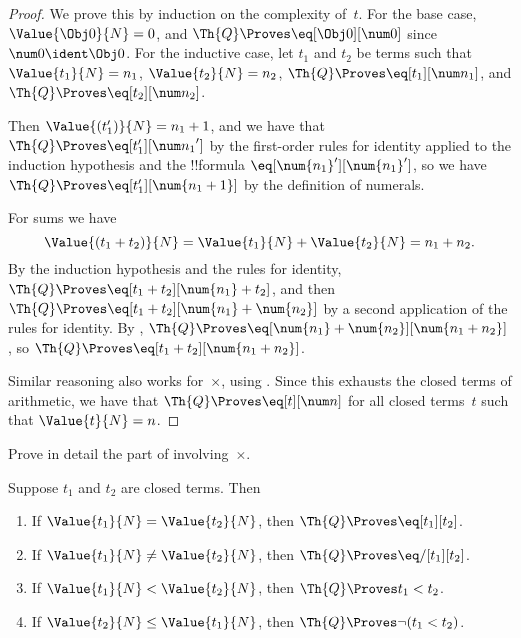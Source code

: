 \documentclass[../../../include/open-logic-section]{subfiles}
\begin{document}
\begin{proof}
We prove this by induction on the complexity of~$t$. For the base case,
$\Value{\Obj 0}{N} = 0$, and $\Th{Q} \Proves \eq[\Obj 0][\num 0]$
since $\num 0 \ident \Obj 0$.
%
For the inductive case, let $t_1$ and $t_2$ be terms such that
$\Value{t_1}{N} = n_1$, $\Value{t_2}{N} = n_2$,
$\Th{Q} \Proves \eq[t_1][\num n_1]$, and
$\Th{Q} \Proves \eq[t_2][\num n_2]$.

Then $\Value{(t_1')}{N} = n_1 + 1$, and we have that $\Th{Q} \Proves
\eq[t_1'][{\num n_1}']$ by the first-order rules for identity applied
to the induction hypothesis and the !!{formula}
$\eq[\num{n_1}'][\num{n_1}']$,
so we have $\Th{Q} \Proves \eq[t_1'][\num{n_1 + 1}]$
by the definition of numerals.

For sums we have
\[
      \Value{(t_1 + t_2)}{N}
    = \Value{t_1}{N} + \Value{t_2}{N}
    = n_1 + n_2.
\]
By the induction hypothesis and the rules for identity,
$\Th{Q} \Proves \eq[t_1 + t_2][\num{n_1} + t_2]$, and then
$\Th{Q} \Proves \eq[t_1 + t_2][\num{n_1} + \num{n_2}]$
by a second application of the rules for identity.
By ,
$\Th{Q} \Proves \eq[\num{n_1} + \num{n_2}][\num{n_1 + n_2}]$,
so $\Th{Q} \Proves \eq[t_1 + t_2][\num{n_1 + n_2}]$.

Similar reasoning also works for~$\times$, using
.
%
Since this exhausts the closed terms of arithmetic, we have that
$\Th{Q} \Proves \eq[t][\num n]$ for all closed terms~$t$ such that
$\Value{t}{N} = n$.
\end{proof}

\begin{prob}
Prove in detail the part of 
involving~$\times$.
\end{prob}

\begin{lem}
Suppose $t_1$ and $t_2$ are closed terms. Then
\begin{enumerate}
\item If $\Value{t_1}{N} = \Value{t_2}{N}$,
    then $\Th{Q} \Proves \eq[t_1][t_2]$.
\item If $\Value{t_1}{N} \neq \Value{t_2}{N}$,
    then $\Th{Q} \Proves \eq/[t_1][t_2]$.
\item If $\Value{t_1}{N} < \Value{t_2}{N}$,
    then $\Th{Q} \Proves t_1 < t_2$.
\item If $\Value{t_2}{N} \leq \Value{t_1}{N}$,
    then $\Th{Q} \Proves \lnot(t_1 < t_2)$.
\end{enumerate}
\end{lem}
\end{document}
